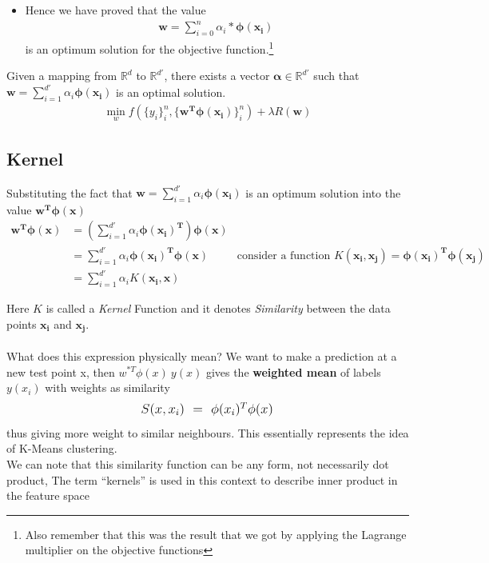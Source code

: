 \documentclass[12pt]{article}
\begin{document}
\begin{itemize}
    \item Hence we have proved that the value 
    \begin{align*}
        \bm{w} = \sum_{i = 0}^n \alpha_i*\bm{\phi(x_i)}\
    \end{align*}
    is an optimum solution for the objective function.\footnote{Also remember that this was the result that we got by applying the Lagrange multiplier on the objective functions }
\end{itemize}

\begin{theorem} 
Given a mapping from $\mathbb{R}^d$ to $\mathbb{R}^{d'}$, there exists a vector 
$\bm{\alpha} \in \mathbb{R}^{d'}$ such that $\bm{w} = \sum_{i = 1}^{d'}\alpha_i \bm{\phi(x_i)}$ is an optimal solution.
\begin{align*}
    \min_w f(\{y_i\}_i^n , \{\bm{w^T\phi(x_i)}\}_i^n) + \lambda R(\bm{w})
\end{align*}     
\end{theorem}

\subsection{Kernel}
\noindent
Substituting the fact that $\bm{w} = \sum_{i = 1}^{d'}\alpha_i \bm{\phi(x_i)}$ is an optimum solution into the value $\bm{w^T\phi(x)}$
\begin{align*}
    \bm{w^T\phi(x)} &= \left( \sum_{i = 1}^{d'}\alpha_i \bm{\phi(x_i)^T} \right) \bm{\phi(x)} \\
        &= \sum_{i = 1}^{d'}\alpha_i \bm{\phi(x_i)^T\phi(x)} & \text{consider a function } K(\bm{x_i}, \bm{x_j}) = \bm{\phi(x_i)^T\phi(x_j)} \\
        &= \sum_{i = 1}^{d'}\alpha_i K(\bm{x_i}, \bm{x})
\end{align*}

Here $K$ is called a \textit{Kernel} Function and it denotes \textit{Similarity} between the data points $\bm{x_i}$ and $\bm{x_j}$. \\ \\
\noindent
What does this expression physically mean? We want to make a prediction at a new test point x, then $w^{*T} \phi(x)\ y(x)$ gives the \textbf{weighted mean} of labels $y(x_i)$ with weights as similarity 
$$ \mbox{ \large
$S(x,x_i)\ =\ \phi(x_i)^T \phi(x)$ 
} $$
thus giving more weight to similar neighbours. This essentially represents the idea of K-Means clustering. \\ 
We can note that this similarity function can be any form, not necessarily dot product, The term “kernels” is used in this context to describe inner product in the feature space  \\
\end{document}
